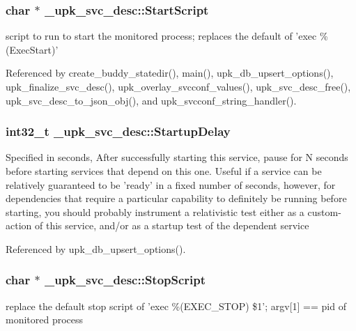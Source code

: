 \subsubsection[{StartScript}]{\setlength{\rightskip}{0pt plus 5cm}char $\ast$ {\bf \_\-upk\_\-svc\_\-desc::StartScript}}\label{struct__upk__svc__desc_a5a86dbf48976bcf166dacd9dc22a29ce}
script to run to start the monitored process; replaces the default of 'exec \%(ExecStart)' 

Referenced by create\_\-buddy\_\-statedir(), main(), upk\_\-db\_\-upsert\_\-options(), upk\_\-finalize\_\-svc\_\-desc(), upk\_\-overlay\_\-svcconf\_\-values(), upk\_\-svc\_\-desc\_\-free(), upk\_\-svc\_\-desc\_\-to\_\-json\_\-obj(), and upk\_\-svcconf\_\-string\_\-handler().

\subsubsection[{StartupDelay}]{\setlength{\rightskip}{0pt plus 5cm}int32\_\-t {\bf \_\-upk\_\-svc\_\-desc::StartupDelay}}\label{struct__upk__svc__desc_a57ad4b1eedd3d25d29ea79de58c3c003}
Specified in seconds, After successfully starting this service, pause for N seconds before starting services that depend on this one. Useful if a service can be relatively guaranteed to be 'ready' in a fixed number of seconds, however, for dependencies that require a particular capability to definitely be running before starting, you should probably instrument a relativistic test either as a custom-\/action of this service, and/or as a startup test of the dependent service 

Referenced by upk\_\-db\_\-upsert\_\-options().

\subsubsection[{StopScript}]{\setlength{\rightskip}{0pt plus 5cm}char $\ast$ {\bf \_\-upk\_\-svc\_\-desc::StopScript}}\label{struct__upk__svc__desc_a2c15fb5318f018e3b6128062158d86f2}
replace the default stop script of 'exec \%(EXEC\_\-STOP) \$1'; argv[1] == pid of monitored process 

